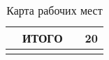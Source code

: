 \begin{longtable}{|p{8mm}|p{40mm}|p{90mm}|c|}

\parbox[c][5mm]{8mm}{} & \parbox{45mm}{ИТОГО} & \parbox{106mm}{} & \parbox{24mm}{20} \\\hline
\caption{Карта рабочих мест}\label{tab:arms}
\end{longtable}  
\normalsize
\clearpage

\clearpage


